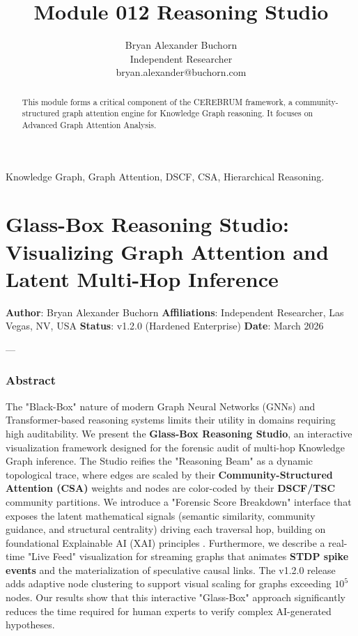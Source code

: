 \documentclass[10pt,journal,compsoc]{IEEEtran}
\begin{document}
\title{Module 012 Reasoning Studio}
\author{Bryan Alexander Buchorn \\ Independent Researcher \\ bryan.alexander@buchorn.com}

\maketitle

\begin{abstract}
This module forms a critical component of the CEREBRUM framework, a community-structured graph attention engine for Knowledge Graph reasoning. It focuses on Advanced Graph Attention Analysis.
\end{abstract}

\begin{IEEEkeywords}
Knowledge Graph, Graph Attention, DSCF, CSA, Hierarchical Reasoning.
\end{IEEEkeywords}

\section{Glass-Box Reasoning Studio: Visualizing Graph Attention and Latent Multi-Hop Inference}

\textbf{Author}: Bryan Alexander Buchorn  
\textbf{Affili\-ations}: Independent Researcher, Las Vegas, NV, USA  
\textbf{Status}: v1.2.0 (Hardened Enterprise)  
\textbf{Date}: March 2026

---

\subsubsection{Abstract}
The "Black-Box" nature of modern Graph Neural Networks (GNNs) and Transformer-based reasoning systems limits their utility in domains requiring high audit\-ability. We present the \textbf{Glass-Box Reasoning Studio}, an interactive visua\-lization framework designed for the forensic audit of multi-hop Knowledge Graph inference. The Studio reifies the "Reasoning Beam" as a dynamic topological trace, where edges are scaled by their \textbf{Community-Structured Attention (CSA)} weights and nodes are color-coded by their \textbf{DSCF/TSC} community partitions. We introduce a "Forensic Score Breakdown" interface that exposes the latent mathe\-matical signals (semantic similarity, community guidance, and structural centrality) driving each traversal hop, building on found\-ational Explainable AI (XAI) principles \cite{samek2017explainable, ribeiro2016lime, lundberg2017shap}. Furthermore, we describe a real-time "Live Feed" visua\-lization for streaming graphs that animates \textbf{STDP spike events} and the mater\-ialization of speculative causal links. The v1.2.0 release adds adaptive node clustering to support visual scaling for graphs exceeding $10^5$ nodes. Our results show that this interactive "Glass-Box" approach signi\-ficantly reduces the time required for human experts to verify complex AI-generated hypotheses.
\end{document}

